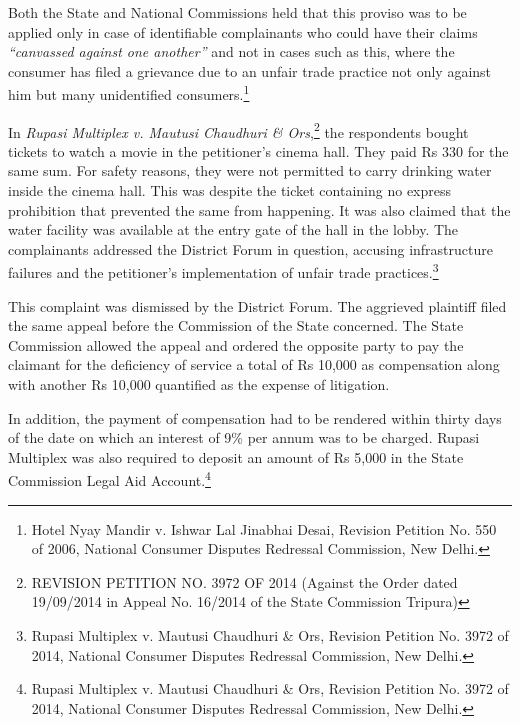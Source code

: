 \begin{multicols}{2}
\vspace{-.15cm}

\noi
Both the State and National Commissions held that this proviso was to be applied only in case
of identifiable complainants who could have their claims \textit{“canvassed against one another”} and
not in cases such as this, where the consumer has filed a grievance due to an unfair trade
practice not only against him but many unidentified consumers.\footnote{Hotel Nyay Mandir v. Ishwar Lal Jinabhai Desai, Revision Petition No. 550 of 2006, National Consumer Disputes Redressal Commission, New Delhi.}

\vspace{-.15cm}

\noi
In \textit{Rupasi Multiplex v. Mautusi Chaudhuri \& Ors},\footnote{REVISION PETITION NO. 3972 OF 2014 (Against the Order dated 19/09/2014 in Appeal No. 16/2014 of the State Commission Tripura)} the respondents bought tickets to watch a movie in the petitioner's cinema hall. They paid Rs 330 for the same sum. For safety reasons, they were not permitted to carry drinking water inside the cinema hall. This was despite the ticket containing no express prohibition that prevented the same from happening. It was also claimed that the water facility was available at the entry gate of the hall in the lobby. The complainants addressed the District Forum in question, accusing infrastructure failures and the petitioner's implementation of unfair trade practices.\footnote{ Rupasi Multiplex v. Mautusi Chaudhuri \& Ors, Revision Petition No. 3972 of 2014, National Consumer Disputes Redressal Commission, New Delhi.}

\vspace{-.1cm}

\noi
This complaint was dismissed by the District Forum. The aggrieved plaintiff filed the same appeal before the Commission of the State concerned. The State Commission allowed the appeal and ordered the opposite party to pay the claimant for the deficiency of service a total of Rs 10,000 as compensation along with another Rs 10,000 quantified as the expense of litigation.

\vspace{-.1cm}

\noi
In addition, the payment of compensation had to be rendered within thirty days of the date on
which an interest of 9\% per annum was to be charged. Rupasi Multiplex was also required to deposit an amount of Rs 5,000 in the State Commission Legal Aid Account.\footnote{Rupasi Multiplex v. Mautusi Chaudhuri \& Ors, Revision Petition No. 3972 of 2014, National Consumer Disputes Redressal Commission, New Delhi.}


\end{multicols}
